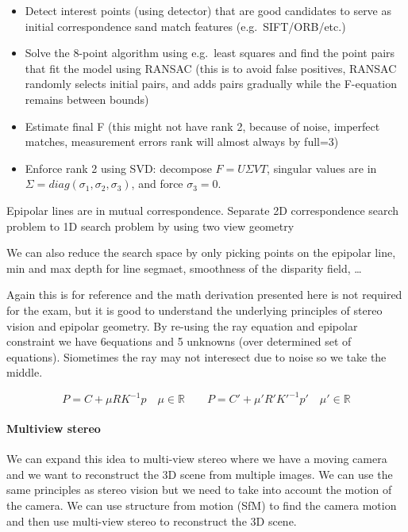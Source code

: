 \documentclass[
  a4paper,
  ,captions=tableheading
]{scrartcl}
\providecommand{\tightlist}{%
  \setlength{\itemsep}{0pt}\setlength{\parskip}{0pt}}
\begin{document}
\begin{itemize}
\tightlist
\item
  Detect interest points (using detector) that are good candidates to
  serve as initial correspondence sand match features
  (e.g.~SIFT/ORB/etc.)
\item
  Solve the 8-point algorithm using e.g.~least squares and find the
  point pairs that fit the model using RANSAC (this is to avoid false
  positives, RANSAC randomly selects initial pairs, and adds pairs
  gradually while the F-equation remains between bounds)
\item
  Estimate final F (this might not have rank 2, because of noise,
  imperfect matches, measurement errors rank will almost always by
  full=3)
\item
  Enforce rank 2 using SVD: decompose \(F=U\Sigma VT\), singular values
  are in \(\Sigma=diag(\sigma_1,\sigma_2,\sigma_3)\), and force
  \(\sigma_3=0\).
\end{itemize}

Epipolar lines are in mutual correspondence. Separate 2D correspondence
search problem to 1D search problem by using two view geometry

We can also reduce the search space by only picking points on the
epipolar line, min and max depth for line segmaet, smoothness of the
disparity field, \ldots{}

Again this is for reference and the math derivation presented here is
not required for the exam, but it is good to understand the underlying
principles of stereo vision and epipolar geometry. By re-using the ray
equation and epipolar constraint we have 6equations and 5 unknowns (over
determined set of equations). Siometimes the ray may not interesect due
to noise so we take the middle.

\[
P = C+\mu RK^{-1}p \quad \mu \in \mathbb{R} \qquad P = C'+\mu' R'K'^{-1}p' \quad \mu' \in \mathbb{R}
\]

\paragraph{Multiview stereo}\label{multiview-stereo}

We can expand this idea to multi-view stereo where we have a moving
camera and we want to reconstruct the 3D scene from multiple images. We
can use the same principles as stereo vision but we need to take into
account the motion of the camera. We can use structure from motion (SfM)
to find the camera motion and then use multi-view stereo to reconstruct
the 3D scene.
\end{document}
